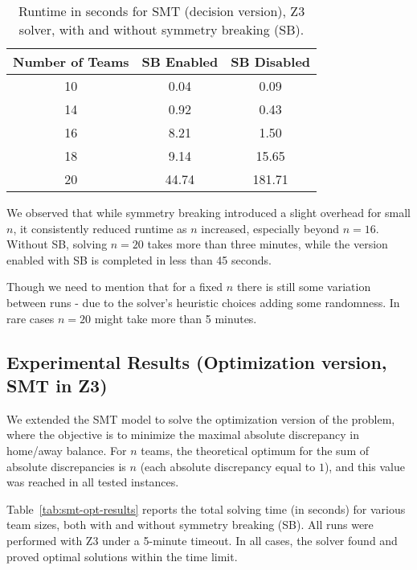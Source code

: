 \documentclass{article}
\begin{document}
\begin{table}[h!]
\centering
\caption{Runtime in seconds for SMT (decision version), Z3 solver, with and without symmetry breaking (SB).}
\label{tab:smt-results}
\begin{tabular}{|c|c|c|}
\hline
\textbf{Number of Teams} & \textbf{SB Enabled} & \textbf{SB Disabled} \\
\hline
10 & 0.04 & 0.09 \\
14 & 0.92 & 0.43 \\
16 & 8.21 & 1.50 \\
18 & 9.14 & 15.65 \\
20 & 44.74 & 181.71 \\
\hline
\end{tabular}
\end{table}

We observed that while symmetry breaking introduced a slight overhead for small $n$, it consistently reduced runtime as $n$ increased, especially beyond $n = 16$. Without SB, solving $n=20$ takes more than three minutes, while the version enabled with SB is completed in less than 45 seconds.

Though we need to mention that for a fixed $n$ there is still some variation between runs - due to the solver's heuristic choices adding some randomness. In rare cases $n=20$ might take more than 5 minutes.

\subsection*{Experimental Results (Optimization version, SMT in Z3)}

We extended the SMT model to solve the optimization version of the problem, where the objective is to minimize the maximal absolute discrepancy in home/away balance. For $n$ teams, the theoretical optimum for the sum of absolute discrepancies is $n$ (each absolute discrepancy equal to $1$), and this value was reached in all tested instances.

Table~\ref{tab:smt-opt-results} reports the total solving time (in seconds) for various team sizes, both with and without symmetry breaking (SB). All runs were performed with Z3 under a 5-minute timeout. In all cases, the solver found and proved optimal solutions within the time limit.
\end{document}
